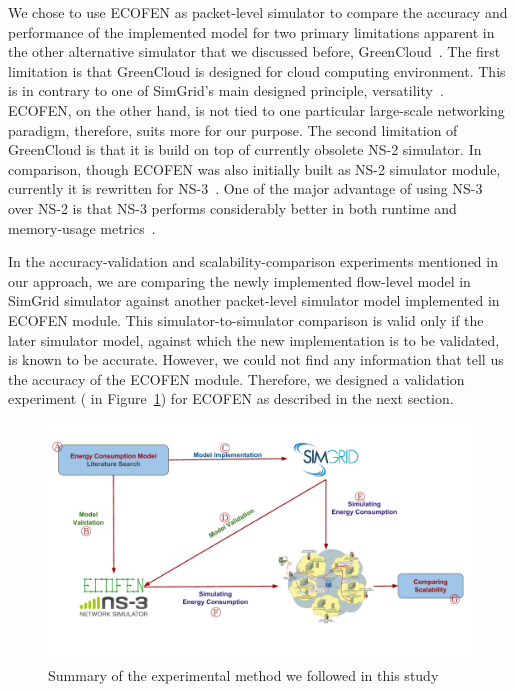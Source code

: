 We chose to use ECOFEN as packet-level simulator to compare the accuracy and performance of the implemented model for two primary limitations apparent in the other alternative simulator that we discussed before, GreenCloud~\cite{DBLP:journals/tjs/KliazovichBK12}. The first limitation is that GreenCloud is designed for cloud computing environment. This is in contrary to one of SimGrid's main designed principle, versatility~\cite{DBLP:journals/jpdc/CasanovaGLQS14}. ECOFEN, on the other hand, is not tied to one particular large-scale networking paradigm, therefore, suits more for our purpose. The second limitation of GreenCloud is that it is build on top of currently obsolete NS-2 simulator. In comparison, though ECOFEN was also initially built as NS-2 simulator module, currently it is rewritten for NS-3~\cite{DBLP:conf/cloudnet/CorneaOL14}. One of the major advantage of using NS-3 over NS-2 is that NS-3 performs considerably better in both runtime and memory-usage metrics~\cite{DBLP:conf/icc/WeingartnerLW09}.

In the accuracy-validation and scalability-comparison experiments mentioned in our approach, we are comparing the newly implemented flow-level model in SimGrid simulator against another packet-level simulator model implemented in ECOFEN module. This simulator-to-simulator comparison is valid only if the later simulator model, against which the new implementation is to be validated, is known to be accurate. However, we could not find any information that tell us the accuracy of the ECOFEN module. Therefore, we designed a validation experiment ( in Figure~\ref{fig:approach}) for ECOFEN as described in the next section. 

\begin{figure}[ht]
	\begin{center}
		\includegraphics[width=13cm]{images/approach.pdf}
		\caption{Summary of the experimental method we followed in this study}
		\label{fig:approach}
	\end{center}
\end{figure}

